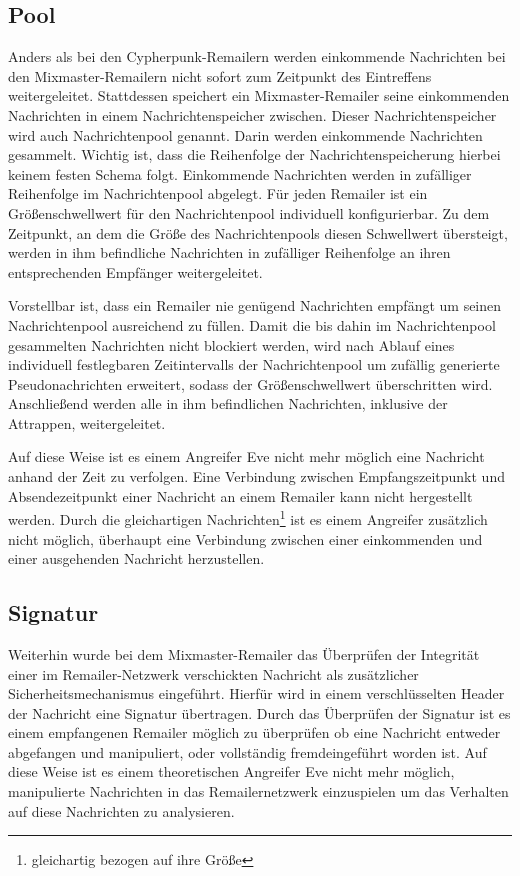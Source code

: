 \subsection{Pool}
Anders als bei den Cypherpunk-Remailern werden einkommende Nachrichten bei den Mixmaster-Remailern nicht sofort zum Zeitpunkt des Eintreffens weitergeleitet. Stattdessen speichert ein Mixmaster-Remailer seine einkommenden Nachrichten in einem Nachrichtenspeicher zwischen. Dieser Nachrichtenspeicher wird auch Nachrichtenpool genannt. Darin werden einkommende Nachrichten gesammelt. Wichtig ist, dass die Reihenfolge der Nachrichtenspeicherung hierbei keinem festen Schema folgt. Einkommende Nachrichten werden in zufälliger Reihenfolge im Nachrichtenpool abgelegt. Für jeden Remailer ist ein Größenschwellwert für den Nachrichtenpool individuell konfigurierbar. Zu dem Zeitpunkt, an dem die Größe des Nachrichtenpools diesen Schwellwert übersteigt, werden in ihm befindliche Nachrichten in zufälliger Reihenfolge an ihren entsprechenden Empfänger weitergeleitet. 

Vorstellbar ist, dass ein Remailer nie genügend Nachrichten empfängt um seinen Nachrichtenpool ausreichend zu füllen. Damit die bis dahin im Nachrichtenpool gesammelten Nachrichten nicht blockiert werden, wird nach Ablauf eines individuell festlegbaren Zeitintervalls der Nachrichtenpool um zufällig generierte Pseudonachrichten erweitert, sodass der Größenschwellwert überschritten wird. Anschließend werden alle in ihm befindlichen Nachrichten, inklusive der Attrappen, weitergeleitet. 

Auf diese Weise ist es einem Angreifer Eve nicht mehr möglich eine Nachricht anhand der Zeit zu verfolgen. Eine Verbindung zwischen Empfangszeitpunkt und Absendezeitpunkt einer Nachricht an einem Remailer kann nicht hergestellt werden. Durch die gleichartigen Nachrichten\footnote{gleichartig bezogen auf ihre Größe} ist es einem Angreifer zusätzlich nicht möglich, überhaupt eine Verbindung zwischen einer einkommenden und einer ausgehenden Nachricht herzustellen. 


\subsection{Signatur}
Weiterhin wurde bei dem Mixmaster-Remailer das Überprüfen der Integrität einer im Remailer-Netzwerk verschickten Nachricht als zusätzlicher Sicherheitsmechanismus eingeführt. Hierfür wird in einem verschlüsselten Header der Nachricht eine Signatur übertragen. Durch das Überprüfen der Signatur ist es einem empfangenen Remailer möglich zu überprüfen ob eine Nachricht entweder abgefangen und manipuliert, oder vollständig fremdeingeführt worden ist. Auf diese Weise ist es einem theoretischen Angreifer Eve nicht mehr möglich, manipulierte Nachrichten in das Remailernetzwerk einzuspielen um das Verhalten auf diese Nachrichten zu analysieren.

